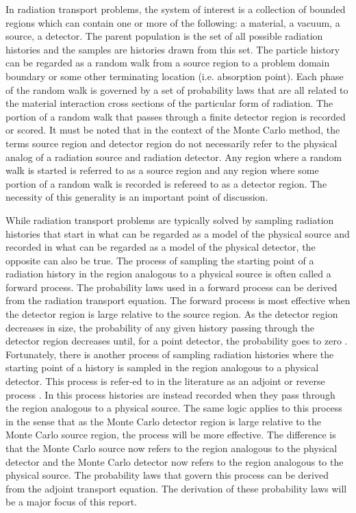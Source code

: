 In radiation transport problems, the system of interest is a collection of 
bounded regions which can contain one or more of the following: a material, a 
vacuum, a source, a detector. The parent population is the set of all possible 
radiation histories and the samples are histories drawn from this set. The 
particle history can be regarded as a random walk from a source region to a 
problem domain boundary or some other terminating location (i.e. absorption 
point). Each phase of the random walk is governed by a set of probability laws 
that are all related to the material interaction cross sections of the 
particular form of radiation. The portion of a random walk that passes through 
a finite detector region is recorded or scored. It must be noted that in the 
context of the Monte Carlo method, the terms source region and detector region 
do not necessarily refer to the physical analog of a radiation source and 
radiation detector. Any region where a random walk is started is referred to 
as a source region and any region where some portion of a random walk is 
recorded is refereed to as a detector region. The necessity of this generality 
is an important point of discussion. 

While radiation transport problems are typically solved by sampling radiation
histories that start in what can be regarded as a model of the physical source
and recorded in what can be regarded as a model of the physical detector, the
opposite can also be true. The process of sampling the starting point of a 
radiation history in the region analogous to a physical source is often called
a forward process. The probability laws used in a forward process can be 
derived from the radiation transport equation. The forward process is most 
effective when the detector region is large relative to the source region. As 
the detector region decreases in size, the probability of any given history 
passing through the detector region decreases until, for a point detector, the 
probability goes to zero \citep{spanier_monte_1969}. Fortunately, there is 
another process of sampling radiation histories where the starting point of a 
history is sampled in the region analogous to a physical detector. This process 
is refer-ed to in the literature as an adjoint or reverse process 
\citep{spanier_monte_1969, desorgher_implementation_2010}. In this process 
histories are instead recorded when they pass through the region analogous to a 
physical source. The same logic applies to this process in the sense that as 
the Monte Carlo detector region is large relative to the Monte Carlo source
region, the process will be more effective. The difference is that the 
Monte Carlo source now refers to the region analogous to the physical detector 
and the Monte Carlo detector now refers to the region analogous to the physical 
source. The probability laws that govern this process can be derived from the 
adjoint transport equation. The derivation of these probability laws will be a 
major focus of this report.


